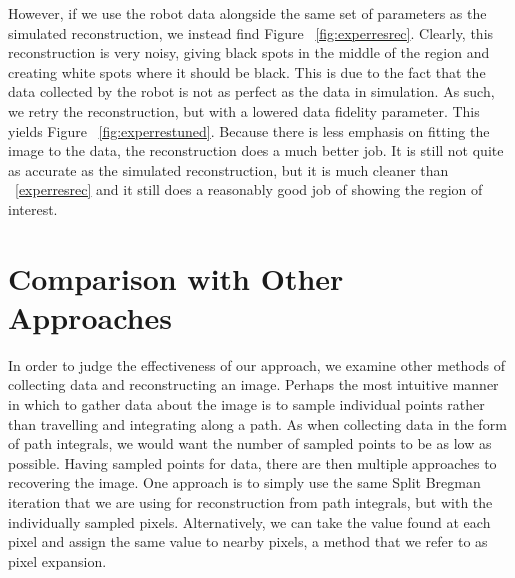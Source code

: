 \documentclass[english]{article}\usepackage[]{graphicx}\usepackage[]{color}
\begin{document}
However, if we use the robot data alongside the same set of parameters as the simulated reconstruction, we instead find Figure ~\ref{fig:experresrec}. Clearly, this reconstruction is very noisy, giving black spots in the middle of the region and creating white spots where it should be black. This is due to the fact that the data collected by the robot is not as perfect as the data in simulation. As such, we retry the reconstruction, but with a lowered data fidelity parameter. This yields Figure ~\ref{fig:experrestuned}. Because there is less emphasis on fitting the image to the data, the reconstruction does a much better job. It is still not quite as accurate as the simulated reconstruction, but it is much cleaner than ~\ref{experresrec} and it still does a reasonably good job of showing the region of interest.


\section{Comparison with Other Approaches}

In order to judge the effectiveness of our approach, we examine other methods of collecting data and reconstructing an image. Perhaps the most intuitive manner in which to gather data about the image is to sample individual points rather than travelling and integrating along a path. As when collecting data in the form of path integrals, we would want the number of sampled points to be as low as possible. Having sampled points for data, there are then multiple approaches to recovering the image. One approach is to simply use the same Split Bregman iteration that we are using for reconstruction from path integrals, but with the individually sampled pixels. Alternatively, we can take the value found at each pixel and assign the same value to nearby pixels, a method that we refer to as pixel expansion.
\end{document}
